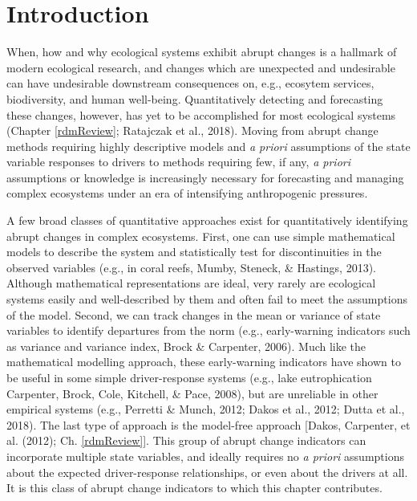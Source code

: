 \documentclass[12pt,twoside,openany]{reedthesis}
\begin{document}
\hypertarget{introduction-3}{%
\section{Introduction}\label{introduction-3}}

When, how and why ecological systems exhibit abrupt changes is a hallmark of modern ecological research, and changes which are unexpected and undesirable can have undesirable downstream consequences on, e.g., ecosytem services, biodiversity, and human well-being. Quantitatively detecting and forecasting these changes, however, has yet to be accomplished for most ecological systems (Chapter \ref{rdmReview}; Ratajczak et al., 2018). Moving from abrupt change methods requiring highly descriptive models and \emph{a priori} assumptions of the state variable responses to drivers to methods requiring few, if any, \emph{a priori} assumptions or knowledge is increasingly necessary for forecasting and managing complex ecosystems under an era of intensifying anthropogenic pressures.

A few broad classes of quantitative approaches exist for quantitatively identifying abrupt changes in complex ecosystems. First, one can use simple mathematical models to describe the system and statistically test for discontinuities in the observed variables (e.g., in coral reefs, Mumby, Steneck, \& Hastings, 2013). Although mathematical representations are ideal, very rarely are ecological systems easily and well-described by them and often fail to meet the assumptions of the model. Second, we can track changes in the mean or variance of state variables to identify departures from the norm (e.g., early-warning indicators such as variance and variance index, Brock \& Carpenter, 2006). Much like the mathematical modelling approach, these early-warning indicators have shown to be useful in some simple driver-response systems (e.g., lake eutrophication Carpenter, Brock, Cole, Kitchell, \& Pace, 2008), but are unreliable in other empirical systems (e.g., Perretti \& Munch, 2012; Dakos et al., 2012; Dutta et al., 2018). The last type of approach is the model-free approach {[}Dakos, Carpenter, et al. (2012); Ch. \ref{rdmReview}{]}. This group of abrupt change indicators can incorporate multiple state variables, and ideally requires no \emph{a priori} assumptions about the expected driver-response relationships, or even about the drivers at all. It is this class of abrupt change indicators to which this chapter contributes.
\end{document}
